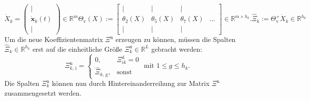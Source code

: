 \begin{subequations}
\begin{equation}
\dot{X}_k = 	\left(\begin{array}{c} 
      					 \mid \\
      					 \dot{\boldsymbol{x}}_k(t)\\ 
      					 \mid 
    				\end{array}\right) \in \mathbb{R}^{m}
\end{equation}
\begin{equation}
\Theta_\text{v}(X) := \begin{bmatrix}
		\mid & \mid &  \mid &\\
		\theta_2(X) & \theta_5(X) & \theta_7(X) &\dots\\
		\mid & \mid &  \mid &
	\end{bmatrix}\in\mathbb{R}^{m\times h_k}.
\end{equation}
\begin{equation}
\hat{\Xi}_k := \Theta_\text{v}^+\dot{X}_k  \in\mathbb{R}^{h_k} \label{eq:xi_select}
\end{equation}
\end{subequations}
Um die neue Koeffizientenmatrix $\Xi^\text{n}$ erzeugen zu können, müssen die Spalten $\hat{\Xi}_k\in\mathbb{R}^{h_k}$ erst auf die einheitliche Größe $\Xi^\text{n}_k\in\mathbb{R}^{L}$ gebracht werden:
\begin{equation}
\Xi^\text{n}_\text{$k$, i} = \begin{cases}
						0, & \Xi^\text{d}_{ik}=0\\
						\hat{\Xi}_\text{$k$, g},  & \text{sonst}

\end{cases}\text{ mit }1\leq g \leq h_k. \label{eq:reshape} 
\end{equation}
Die Spalten $\Xi^\text{n}_k$ können nun durch Hintereinanderreihung zur Matrix $\Xi^\text{n}$ zusammengesetzt werden. 

